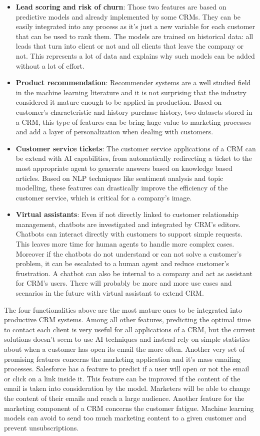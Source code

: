 \begin{itemize}
    \item \textbf{Lead scoring and risk of churn}: Those two features are based on predictive models and already implemented by some CRMs. They can be easily integrated into any process as it's just a new variable for each customer that can be used to rank them. The models are trained on historical data: all leads that turn into client or not and all clients that leave the company or not. This represents a lot of data and explains why such models can be added without a lot of effort.
    \item \textbf{Product recommendation}: Recommender systems are a well studied field in the machine learning literature and it is not surprising that the industry considered it mature enough to be applied in production. Based on customer's characteristic and history purchase history, two datasets stored in a CRM, this type of features can be bring huge value to marketing processes and add a layer of personalization when dealing with customers.
    \item \textbf{Customer service tickets}: The customer service applications of a CRM can be extend with AI capabilities, from automatically redirecting a ticket to the most appropriate agent to generate answers based on knowledge based articles. Based on NLP techniques like sentiment analysis and topic modelling, these features can drastically improve the efficiency of the customer service, which is critical for a company's image.
    \item \textbf{Virtual assistants}: Even if not directly linked to customer relationship management, chatbots are investigated and integrated by CRM's editors. Chatbots can interact directly with customers to support simple requests. This leaves more time for human agents to handle more complex cases. Moreover if the chatbots do not understand or can not solve a customer's problem, it can be escalated to a human agent and reduce customer's frustration. A chatbot can also be internal to a company and act as assistant for CRM's users. There will probably be more and more use cases and scenarios in the future with virtual assistant to extend CRM.
\end{itemize}

The four functionalities above are the most mature ones to be integrated into productive CRM systems. Among all other features, predicting the optimal time to contact each client is very useful for all applications of a CRM, but the current solutions doesn't seem to use AI techniques and instead rely on simple statistics about when a customer has open its email the more often. Another very set of promising features concerns the marketing application and it's mass emailing processes. Salesforce has a feature to predict if a user will open or not the email or click on a link inside it. This feature can be improved if the content of the email is taken into consideration by the model. Marketers will be able to change the content of their emails and reach a large audience. Another feature for the marketing component of a CRM concerns the customer fatigue. Machine learning models can avoid to send too much marketing content to a given customer and prevent unsubscriptions.

